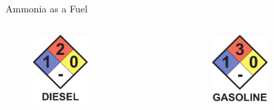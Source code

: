 \begin{frame}{Ammonia as a Fuel}

    \begin{columns}[c, onlytextwidth]

        \begin{column}{0.33\textwidth}

            \begin{figure}[H]
                \centering
                \includegraphics[width=0.5\textwidth]{pdf/nfpa-diesel.pdf}
            \end{figure}

        \end{column}

        \begin{column}{0.33\textwidth}

            \begin{figure}[H]
                \centering
                \includegraphics[width=0.5\textwidth]{pdf/nfpa-gasoline.pdf}
            \end{figure}


\end{column}
\end{columns}
\end{frame}
